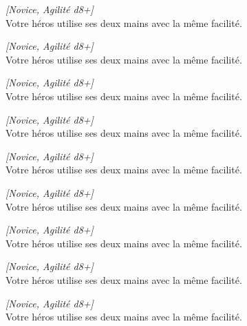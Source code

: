 \begin{description}[align=left]
    \item [Ambidextre]
    	\emph{[Novice, Agilité d8+]}\\
        Votre héros utilise ses deux mains avec la même facilité.

    \item [Ambidextre]
    	\emph{[Novice, Agilité d8+]}\\
        Votre héros utilise ses deux mains avec la même facilité.

    \item [Ambidextre]
    	\emph{[Novice, Agilité d8+]}\\
        Votre héros utilise ses deux mains avec la même facilité.

    \item [Ambidextre]
    	\emph{[Novice, Agilité d8+]}\\
        Votre héros utilise ses deux mains avec la même facilité.

    \item [Ambidextre]
    	\emph{[Novice, Agilité d8+]}\\
        Votre héros utilise ses deux mains avec la même facilité.

    \item [Ambidextre]
    	\emph{[Novice, Agilité d8+]}\\
        Votre héros utilise ses deux mains avec la même facilité.

    \item [Ambidextre]
    	\emph{[Novice, Agilité d8+]}\\
        Votre héros utilise ses deux mains avec la même facilité.

    \item [Ambidextre]
    	\emph{[Novice, Agilité d8+]}\\
        Votre héros utilise ses deux mains avec la même facilité.

    \item [Ambidextre]
    	\emph{[Novice, Agilité d8+]}\\
        Votre héros utilise ses deux mains avec la même facilité.


\end{description}